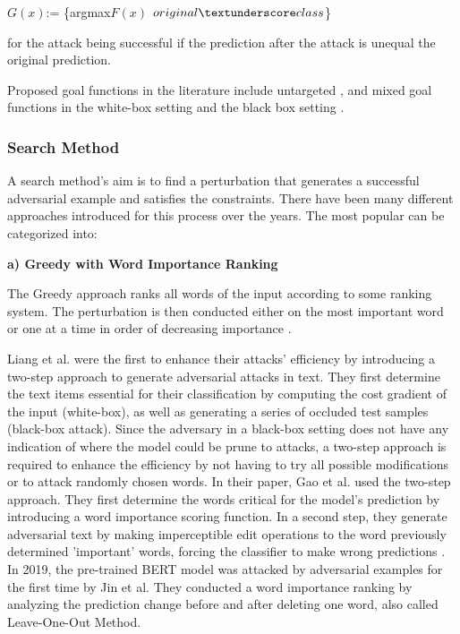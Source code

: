 $G(x)$:= \{argmax$F(x)$ \neq $original\textunderscore class$\}

for the attack being successful if the prediction after the attack is unequal the original prediction. 

Proposed goal functions in the literature include untargeted \cite{ebrahimi2017hotflip, alzantot2018generating, li2018textbugger, jin2019bert, garg2020bae}, and mixed goal functions \cite{gao2018black} in the white-box setting \cite{papernot2016crafting, liang2017deep, ebrahimi2017hotflip, jin2019bert} and the black box setting \cite{gao2018black, goodman2020fastwordbug}.

\subsubsection{Search Method}

A search method's aim is to find a perturbation that generates a successful adversarial example and satisfies the constraints. There have been many different approaches introduced for this process over the years. The most popular can be categorized into:

    \textbf{a) Greedy with Word Importance Ranking}
    
        The Greedy approach ranks all words of the input according to some ranking system. The perturbation is then conducted either on the most important word or one at a time in order of decreasing importance \cite{li2018textbugger, jin2019bert, garg2020bae}.
    
        Liang et al. were the first to enhance their attacks' efficiency by introducing a two-step approach to generate adversarial attacks in text. They first determine the text items essential for their classification by computing the cost gradient of the input (white-box), as well as generating a series of occluded test samples (black-box attack)\cite{liang2017deep}. 
        Since the adversary in a black-box setting does not have any indication of where the model could be prune to attacks, a two-step approach is required to enhance the efficiency by not having to try all possible modifications or to attack randomly chosen words. 
        In their paper, Gao et al. used the two-step approach. They first determine the words critical for the model's prediction by introducing a word importance scoring function. In a second step, they generate adversarial text by making imperceptible edit operations to the word previously determined 'important' words, forcing the classifier to make wrong predictions \cite{gao2018black}.
        In 2019, the pre-trained BERT model was attacked by adversarial examples for the first time by Jin et al. They conducted a word importance ranking by analyzing the prediction change before and after deleting one word, also called Leave-One-Out Method.  
        
